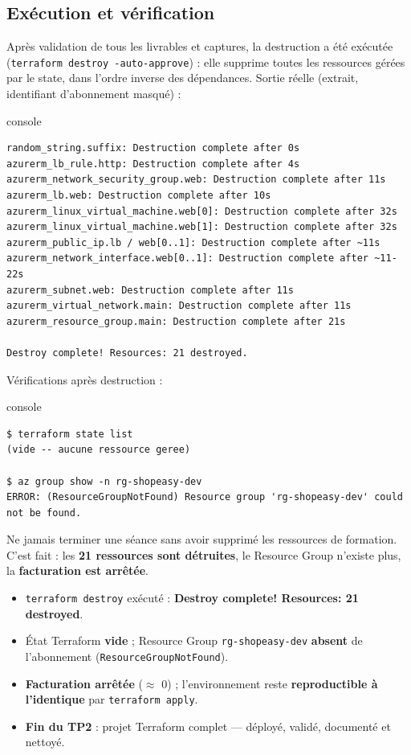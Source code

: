 \documentclass[11pt,a4paper]{article}
\newcommand{\code}[1]{\texttt{#1}}
\begin{document}
\subsection{Exécution et vérification}
Après validation de tous les livrables et captures, la destruction a été exécutée (\code{terraform destroy
-auto-approve}) : elle supprime toutes les ressources gérées par le state, dans l'ordre inverse des
dépendances. Sortie réelle (extrait, identifiant d'abonnement masqué) :
\begin{codebox}{console}
\begin{Verbatim}
random_string.suffix: Destruction complete after 0s
azurerm_lb_rule.http: Destruction complete after 4s
azurerm_network_security_group.web: Destruction complete after 11s
azurerm_lb.web: Destruction complete after 10s
azurerm_linux_virtual_machine.web[0]: Destruction complete after 32s
azurerm_linux_virtual_machine.web[1]: Destruction complete after 32s
azurerm_public_ip.lb / web[0..1]: Destruction complete after ~11s
azurerm_network_interface.web[0..1]: Destruction complete after ~11-22s
azurerm_subnet.web: Destruction complete after 11s
azurerm_virtual_network.main: Destruction complete after 11s
azurerm_resource_group.main: Destruction complete after 21s

Destroy complete! Resources: 21 destroyed.
\end{Verbatim}
\end{codebox}
Vérifications après destruction :
\begin{codebox}{console}
\begin{Verbatim}
$ terraform state list
(vide -- aucune ressource geree)

$ az group show -n rg-shopeasy-dev
ERROR: (ResourceGroupNotFound) Resource group 'rg-shopeasy-dev' could not be found.
\end{Verbatim}
\end{codebox}

\begin{notebox}
Ne jamais terminer une séance sans avoir supprimé les ressources de formation. C'est fait : les \textbf{21
ressources sont détruites}, le Resource Group n'existe plus, la \textbf{facturation est arrêtée}.
\end{notebox}

\begin{etatbox}
\begin{itemize}
  \item \code{terraform destroy} exécuté : \textbf{Destroy complete! Resources: 21 destroyed}.
  \item État Terraform \textbf{vide} ; Resource Group \code{rg-shopeasy-dev} \textbf{absent} de l'abonnement (\code{ResourceGroupNotFound}).
  \item \textbf{Facturation arrêtée} ($\approx$ 0) ; l'environnement reste \textbf{reproductible à l'identique} par \code{terraform apply}.
  \item \textbf{Fin du TP2} : projet Terraform complet — déployé, validé, documenté et nettoyé.
\end{itemize}
\end{etatbox}
\end{document}
